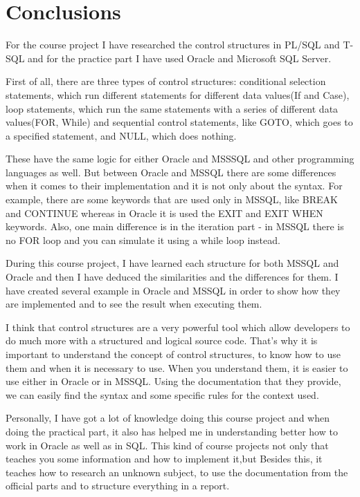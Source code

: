 \section*{Conclusions}

For the course project I have researched the control structures in PL/SQL and T-SQL and for the practice part I have used Oracle and Microsoft SQL Server.\newline

First of all, there are three types of control structures:
conditional selection statements, which run different statements for different data values(If and Case), loop statements, which run the same statements with a series of different data values(FOR, While) and sequential control statements, like GOTO, which goes to a specified statement, and NULL, which does nothing.\newline

These have the same logic for either Oracle and MSSSQL and other programming languages as well. But between Oracle and MSSQL there are some differences when it comes to their implementation and it is not only about the syntax. For example, there are some keywords that are used only in MSSQL, like BREAK and CONTINUE whereas in Oracle it is used the EXIT and EXIT WHEN keywords. Also, one main difference is in the iteration part - in MSSQL there is no FOR loop and you can simulate it using a while loop instead. \newline

During this course project, I have learned each structure for both MSSQL and Oracle and then I have deduced the similarities and the differences for them. I have created several example in Oracle and MSSQL in order to show how they are implemented and to see the result when executing them. \newline

I think that control structures are a very powerful tool which allow developers to do much more with a structured and logical source code. That's why it is important to understand the concept of control structures, to know how to use them and when it is necessary to use. When you understand them, it is easier to use either in Oracle or in MSSQL. Using the documentation that they provide, we can easily find the syntax and some specific rules for the context used. \newline

Personally, I have got a lot of knowledge doing this course project and when doing the practical part, it also has helped me in understanding better how to work in Oracle as well as in SQL. This kind of course projects not only that teaches you some information and how to implement it,but Besides this, it teaches how to research an unknown subject, to use the documentation from the official parts and to structure everything in a  report.  


\clearpage